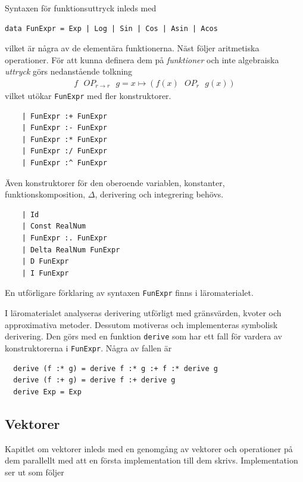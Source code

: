 Syntaxen för funktionsuttryck inleds med

\begin{lstlisting}
data FunExpr = Exp | Log | Sin | Cos | Asin | Acos
\end{lstlisting}

vilket är några av de elementära funktionerna. Näst följer aritmetiska operationer. För att kunna definera dem på \textit{funktioner} och inte algebraiska \textit{uttryck} görs nedanstående tolkning
\begin{align*}
  f \text{ $OP_{r \to r}$ } g = x \mapsto (f(x) \text{ $OP_r$ } g(x))
\end{align*}
vilket utökar \texttt{FunExpr} med fler konstruktorer.

\begin{lstlisting}
    | FunExpr :+ FunExpr
    | FunExpr :- FunExpr
    | FunExpr :* FunExpr
    | FunExpr :/ FunExpr
    | FunExpr :^ FunExpr
\end{lstlisting}

Även konstruktorer för den oberoende variablen, konstanter, funktionskomposition, $\Delta$, derivering och integrering behövs.

\begin{lstlisting}
    | Id
    | Const RealNum
    | FunExpr :. FunExpr
    | Delta RealNum FunExpr
    | D FunExpr
    | I FunExpr
\end{lstlisting}

En utförligare förklaring av syntaxen \texttt{FunExpr} finns i läromaterialet.

I läromaterialet analyseras derivering utförligt med gränsvärden, kvoter och approximativa metoder. Dessutom motiveras och implementeras symbolisk derivering. Den görs med en funktion \texttt{derive} som har ett fall för vardera av konstruktorerna i \texttt{FunExpr}. Några av fallen är

\begin{lstlisting}
  derive (f :* g) = derive f :* g :+ f :* derive g
  derive (f :+ g) = derive f :+ derive g
  derive Exp = Exp
\end{lstlisting}

\subsection{Vektorer}

Kapitlet om vektorer inleds med en genomgång av vektorer och operationer på dem parallellt med att en första implementation till dem skrivs. Implementation ser ut som följer

